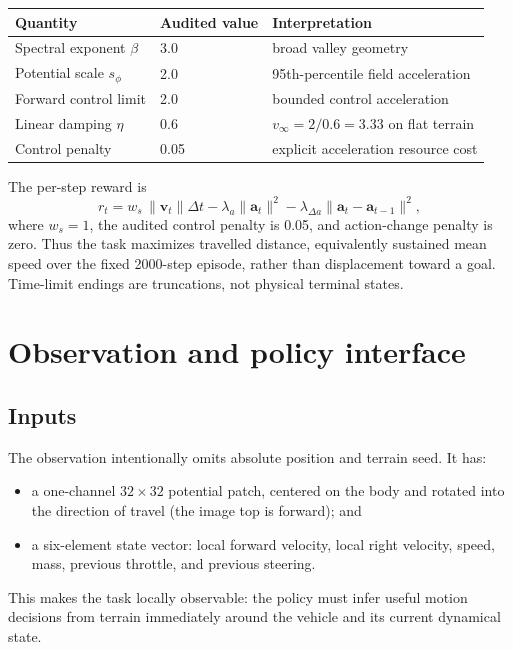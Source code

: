 \documentclass[10pt]{article}
\begin{document}
\begin{center}
\begin{tabular}{lll}
\toprule
Quantity & Audited value & Interpretation\\
\midrule
Spectral exponent $\beta$ & 3.0 & broad valley geometry\\
Potential scale $s_\phi$ & 2.0 & 95th-percentile field acceleration\\
Forward control limit & 2.0 & bounded control acceleration\\
Linear damping $\eta$ & 0.6 & $v_\infty=2/0.6=3.33$ on flat terrain\\
Control penalty & 0.05 & explicit acceleration resource cost\\
\bottomrule
\end{tabular}
\end{center}

The per-step reward is
\begin{equation}
  r_t = w_s \, \|\mathbf{v}_t\|\Delta t
  - \lambda_a\|\mathbf{a}_t\|^2
  - \lambda_{\Delta a}\|\mathbf{a}_t-\mathbf{a}_{t-1}\|^2,
\end{equation}
where $w_s=1$, the audited control penalty is 0.05, and action-change penalty is
zero. Thus the task
maximizes travelled distance, equivalently sustained mean speed over the fixed
2000-step episode, rather than displacement toward a goal. Time-limit endings
are truncations, not physical terminal states.

\section{Observation and policy interface}
\subsection{Inputs}
The observation intentionally omits absolute position and terrain seed. It has:
\begin{itemize}[leftmargin=1.4em,itemsep=2pt]
  \item a one-channel $32\times32$ potential patch, centered on the body and
  rotated into the direction of travel (the image top is forward); and
  \item a six-element state vector: local forward velocity, local right velocity,
  speed, mass, previous throttle, and previous steering.
\end{itemize}
This makes the task locally observable: the policy must infer useful motion
decisions from terrain immediately around the vehicle and its current dynamical state.
\end{document}

